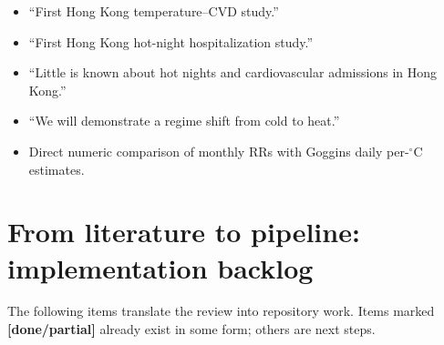 \documentclass[11pt]{article}
\begin{document}
\begin{itemize}
  \item ``First Hong Kong temperature--CVD study.''
  \item ``First Hong Kong hot-night hospitalization study.''
  \item ``Little is known about hot nights and cardiovascular admissions in Hong Kong.''
  \item ``We will demonstrate a regime shift from cold to heat.''
  \item Direct numeric comparison of monthly RRs with Goggins daily per-$^\circ$C
        estimates.
\end{itemize}

\section{From literature to pipeline: implementation backlog}

The following items translate the review into repository work. Items marked
\textbf{[done/partial]} already exist in some form; others are next steps.
\end{document}
